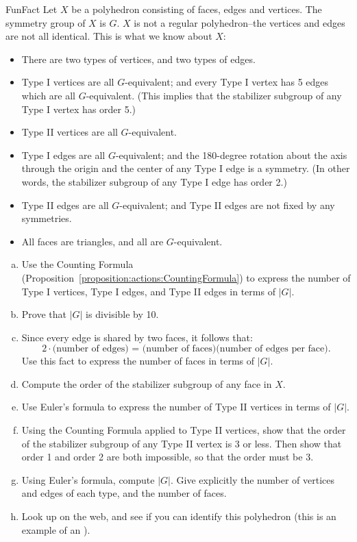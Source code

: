 \begin{exercise}{FunFact}
Let $X$ be a polyhedron consisting of faces, edges and vertices. The symmetry group of $X$ is $G$. $X$ is not a regular polyhedron--the vertices and edges are not all identical.  This is what we know about $X$:
\begin{itemize}
\item
There are two types of vertices, and two types of edges. 
\item Type I vertices are all $G$-equivalent; and every Type I vertex has 5 edges which are all $G$-equivalent. (This implies that the stabilizer subgroup of any Type I vertex has order 5.)
\item Type II vertices are all $G$-equivalent.
\item Type I edges are all $G$-equivalent; and the 180-degree rotation about the axis through the origin and the center of any Type I edge is a symmetry. (In other words, the stabilizer subgroup  of any Type I edge has order 2.)
\item Type II edges are all $G$-equivalent; and Type II edges are not fixed by any symmetries.
\item All faces are triangles, and all are $G$-equivalent.
\end{itemize}
\begin{enumerate}[(a)]
\item 
Use the Counting Formula (Proposition~\ref{proposition:actions:CountingFormula}) to express the number of Type I vertices, Type I  edges, and Type II edges in terms of $|G|$.
\item 
Prove that $|G|$ is divisible by 10.
\item
Since every edge is shared by two faces, it follows that:
\[ 2 \cdot \text{(number of edges) = (number of faces)(number of edges per face)}.\]
Use this fact to express the number of faces in terms of $|G|$.
\item
Compute the order of the stabilizer subgroup of any face in $X$.
\item
Use Euler's formula to express the number of Type II vertices in terms of $|G|$.
\item
Using the Counting Formula applied to Type II vertices, show that the order of the stabilizer subgroup of any Type II vertex is 3 or less. Then show that  order 1 and order 2 are both impossible, so that the order must be 3.
\item
Using Euler's formula, compute $|G|$. Give explicitly the number of vertices and edges of each type, and the number of faces.
\item
Look up on the web, and see if you can identify this polyhedron (this is an example of an ).
\end{enumerate}
\end{exercise}

